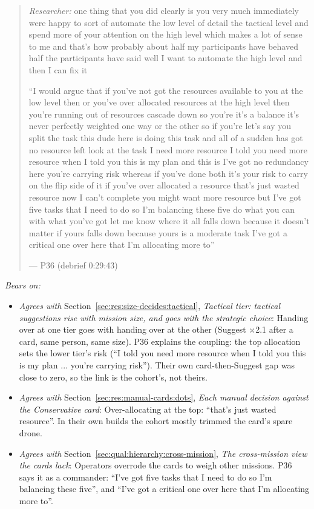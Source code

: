\begin{quote}\small
{\footnotesize\textit{Researcher:} one thing that you did clearly is you very much immediately were happy to sort of automate the low level of detail the tactical level and spend more of your attention on the high level which makes a lot of sense to me and that's how probably about half my participants have behaved half the participants have said well I want to automate the high level and then I can fix it}\par\smallskip
``I would argue that if you've not got the resources available to you at the low level then or you've over allocated resources at the high level then you're running out of resources cascade down so you're it's a balance it's never perfectly weighted one way or the other so if you're let's say you split the task this dude here is doing this task and all of a sudden has got no resource left look at the task I need more resource I told you need more resource when I told you this is my plan and this is I've got no redundancy here you're carrying risk whereas if you've done both it's your risk to carry on the flip side of it if you've over allocated a resource that's just wasted resource now I can't complete you might want more resource but I've got five tasks that I need to do so I'm balancing these five do what you can with what you've got let me know where it all falls down because it doesn't matter if yours falls down because yours is a moderate task I've got a critical one over here that I'm allocating more to''\par\hfill--- P36 (debrief 0:29:43)
\end{quote}

\noindent\textit{Bears on:}
\begin{itemize}[leftmargin=1.2em,itemsep=1pt]\small
\item \textit{Agrees with} Section~\ref{sec:res:size-decides:tactical}, \emph{Tactical tier: tactical suggestions rise with mission size, and goes with the strategic choice}: Handing over at one tier goes with handing over at the other (Suggest $\times$2.1 after a card, same person, same size). P36 explains the coupling: the top allocation sets the lower tier's risk (``I told you need more resource when I told you this is my plan ... you're carrying risk''). Their own card-then-Suggest gap was close to zero, so the link is the cohort's, not theirs.
\item \textit{Agrees with} Section~\ref{sec:res:manual-cards:dots}, \emph{Each manual decision against the Conservative card}: Over-allocating at the top: ``that's just wasted resource''. In their own builds the cohort mostly trimmed the card's spare drone.
\item \textit{Agrees with} Section~\ref{sec:qual:hierarchy:cross-mission}, \emph{The cross-mission view the cards lack}: Operators overrode the cards to weigh other missions. P36 says it as a commander: ``I've got five tasks that I need to do so I'm balancing these five'', and ``I've got a critical one over here that I'm allocating more to''.
\end{itemize}

